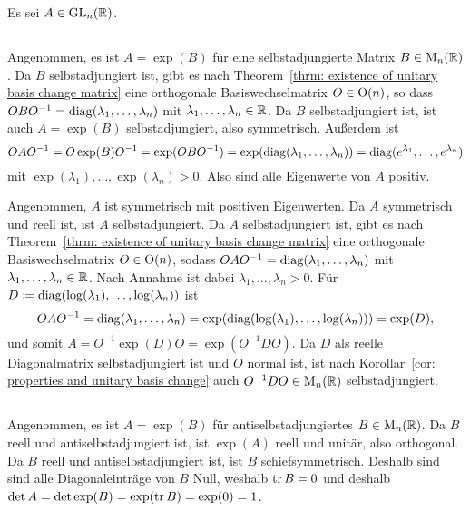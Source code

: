 \documentclass[a4paper, 10pt, numbers=noenddot]{scrartcl}
\begin{document}
Es sei $A \in \operatorname{GL}_n(\mathbb{R})$.





\subsection{}

Angenommen, es ist $A = \exp(B)$ für eine selbstadjungierte Matrix $B \in \operatorname{M}_n(\mathbb{R})$.
Da $B$ selbstadjungiert ist, gibt es nach Theorem~\ref{thrm: existence of unitary basis change matrix} eine orthogonale Basiswechselmatrix $O \in \operatorname{O}(n)$, so dass $O B O^{-1} = \operatorname{\operatorname{diag}}(\lambda_1, \dotsc, \lambda_n)$ mit $\lambda_1, \dotsc, \lambda_n \in \mathbb{R}$.
Da $B$ selbstadjungiert ist, ist auch $A = \exp(B)$ selbstadjungiert, also symmetrisch.
Außerdem ist
\[
    O A O^{-1}
  = O \exp(B) O^{-1}
  = \exp(O B O^{-1})
  = \exp( \operatorname{\operatorname{diag}}(\lambda_1, \dotsc, \lambda_n) )
  = \operatorname{\operatorname{diag}}(e^{\lambda_1}, \dotsc, e^{\lambda_n})
\]
mit $\exp(\lambda_1), \dotsc, \exp(\lambda_n) > 0$.
Also sind alle Eigenwerte von $A$ positiv.

Angenommen, $A$ ist symmetrisch mit positiven Eigenwerten.
Da $A$ symmetrisch und reell ist, ist $A$ selbstadjungiert.
Da $A$ selbstadjungiert ist, gibt es nach Theorem~\ref{thrm: existence of unitary basis change matrix} eine orthogonale Basiswechselmatrix $O \in \operatorname{O}(n)$, sodass $O A O^{-1} = \operatorname{\operatorname{diag}}(\lambda_1, \dotsc, \lambda_n)$ mit \mbox{$\lambda_1, \dotsc, \lambda_n \in \mathbb{R}$}.
Nach Annahme ist dabei $\lambda_1, \dotsc, \lambda_n > 0$.
Für $D \coloneqq \operatorname{\operatorname{diag}}(\log(\lambda_1), \dotsc, \log(\lambda_n))$ ist
\[
    O A O^{-1}
  = \operatorname{\operatorname{diag}}(\lambda_1, \dotsc, \lambda_n)
  = \exp(\operatorname{\operatorname{diag}}(\log(\lambda_1), \dotsc, \log(\lambda_n)))
  = \exp(D),
\]
und somit $A = O^{-1} \exp(D) O = \exp(O^{-1} D O)$.
Da $D$ als reelle Diagonalmatrix selbstadjungiert ist und $O$ normal ist, ist nach Korollar~\ref{cor: properties and unitary basis change} auch $O^{-1} D O \in \operatorname{M}_n(\mathbb{R})$ selbstadjungiert.





\subsection{}

Angenommen, es ist $A = \exp(B)$ für antiselbstadjungiertes $B \in \operatorname{M}_n(\mathbb{R})$.
Da $B$ reell und antiselbstadjungiert ist, ist $\exp(A)$ reell und unitär, also orthogonal.
Da $B$ reell und antiselbstadjungiert ist, ist $B$ schiefsymmetrisch.
Deshalb sind sind alle Diagonaleinträge von $B$ Null, weshalb $\operatorname{tr} B = 0$ und deshalb $\det A = \det \exp(B) = \exp(\operatorname{tr} B) = \exp(0) = 1$.
\end{document}
